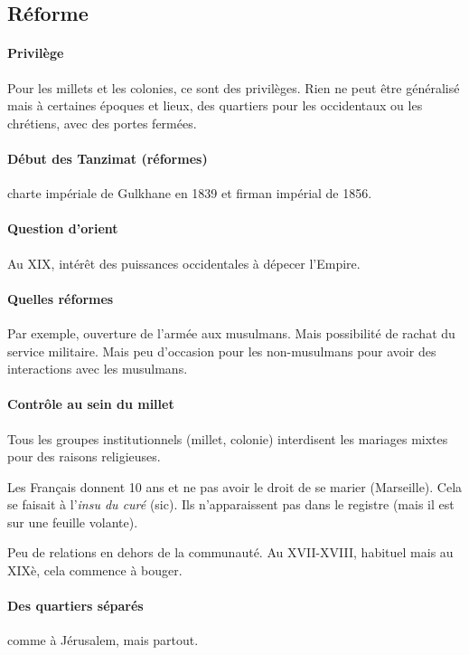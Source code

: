 \subsection{Réforme}
\paragraph{Privilège} Pour les millets et les colonies, ce sont des privilèges. Rien ne peut être généralisé mais à certaines époques et lieux, des quartiers pour les occidentaux ou les chrétiens, avec des portes fermées.

\paragraph{Début des Tanzimat (réformes)} charte impériale de Gulkhane en 1839 et firman impérial de 1856. 

\paragraph{Question d'orient} Au XIX, intérêt des puissances occidentales à dépecer l'Empire.

\paragraph{Quelles réformes} Par exemple, ouverture de l'armée aux musulmans. Mais possibilité de rachat du service militaire. Mais peu d'occasion pour les non-musulmans pour avoir des interactions avec les musulmans. 

\paragraph{Contrôle au sein du millet} Tous les groupes institutionnels (millet, colonie) interdisent les mariages mixtes pour des raisons religieuses. 
\begin{Ex}
Les Français donnent 10 ans et ne pas avoir le droit de se marier (Marseille).
Cela se faisait à l'\textit{insu du curé} (sic). Ils n'apparaissent pas dans le registre (mais il est sur une feuille volante). 

\end{Ex}
Peu de relations en dehors de la communauté. Au XVII-XVIII, habituel mais au XIXè, cela commence à bouger. 
\paragraph{Des quartiers séparés} comme à Jérusalem, mais partout.

